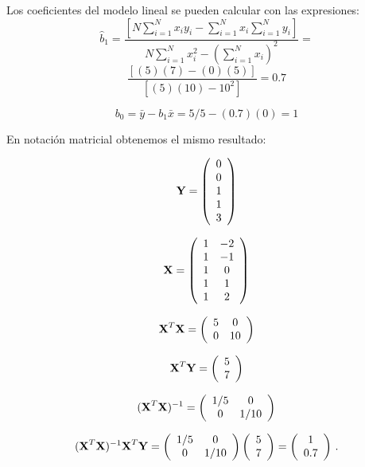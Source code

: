 \documentclass[
]{agujournal2019}
\begin{document}
Los coeficientes del modelo lineal se pueden calcular con las
expresiones:
\[\hat{b}_1=\frac{\left[N \sum\limits^N_{i=1} x_i y_i - \sum\limits^N_{i=1}x_i \sum\limits^N_{i=1}y_i\right]}
           {N\sum\limits^N_{i=1}x^2_i-\left(\sum\limits^N_{i=1}x_i \right)^2}=\]
\[\frac{[(5)(7)-(0)(5)]}{[(5)(10)-10^2]}=0.7\]

\[b_0=\bar{y}-b_1\bar{x}=5/5-(0.7)(0)=1\]

En notación matricial obtenemos el mismo resultado:

\[{\textbf Y}=\left(\begin{array}{c}
  0 \\ 0 \\ 1 \\ 1 \\ 3\\
        \end{array}\right)\]

\[{\textbf X}=\left(\begin{array}{cc}
  1 & -2 \\
  1 & -1 \\
  1 & 0 \\
  1 & 1 \\
  1 & 2\\
        \end{array}\right)\]

\[{\textbf X}^T{\textbf X}= \left(\begin{array}{ccccc}
   5 &  0 \\
  0 & 10 \\
        \end{array}\right)\]

\[{\textbf X}^T{\textbf Y}= \left(\begin{array}{ccccc}
   5  \\
  7  \\
        \end{array}\right)\]

\[({\textbf X}^T{\textbf X})^{-1}= \left(\begin{array}{ccccc}
   1/5 &  0 \\
   0 & 1/10 \\
        \end{array}\right)\]

\[ ({\textbf X}^T{\textbf X})^{-1}{\textbf X}^T{\textbf Y}=
    \left(\begin{array}{ccccc}
   1/5 &  0 \\
   0 & 1/10 \\
        \end{array}\right)\left(\begin{array}{ccccc}
   5  \\
  7  \\
        \end{array}\right)=
    \left(\begin{array}{ccccc}
   1  \\
  0.7  \\
        \end{array}\right)\,.\]
\end{document}
